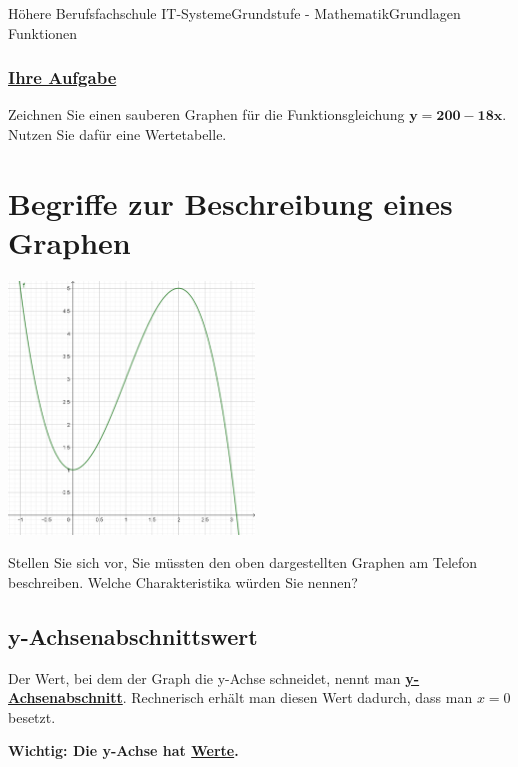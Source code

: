 \documentclass[11pt,twocolumn,oneside,openany,headings=optiontotoc,11pt,numbers=noenddot]{article}
\begin{document}
\begin{worksheet}{Höhere Berufsfachschule IT-Systeme}{Grundstufe - Mathematik}{Grundlagen Funktionen}
		\subsubsection*{\underline{Ihre Aufgabe}}
		Zeichnen Sie einen sauberen Graphen für die Funktionsgleichung \(\mathbf{y = 200-18x}\).\\
		Nutzen Sie dafür eine Wertetabelle.
		\section{Begriffe zur Beschreibung eines Graphen}
		\includegraphics[width=0.49\textwidth]{../99_Bilder/basicsBsp.png}\\
		\par\bigskip\noindent
		Stellen Sie sich vor, Sie müssten den oben dargestellten Graphen am Telefon beschreiben. Welche Charakteristika würden Sie nennen?
		\subsection*{y-Achsenabschnittswert}
		Der Wert, bei dem der Graph die y-Achse schneidet, nennt man \textbf{\underline{y-Achsenabschnitt}}. Rechnerisch erhält man diesen Wert dadurch, dass man \(x= 0\) besetzt.\\
		\par\bigskip\noindent
		\textbf{Wichtig: Die y-Achse hat \underline{Werte}.}

\end{worksheet}
\end{document}

